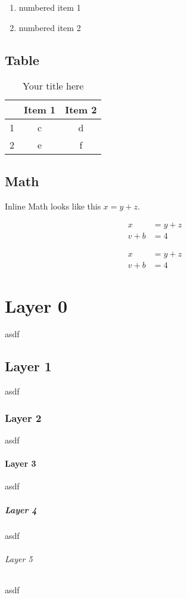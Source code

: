 \begin{enumerate}
	\item numbered item 1
	\item numbered item 2
\end{enumerate}

\section{Table}

\begin{table}[H] %
	\begin{center}
		\begin{tabular}{ccc}
			& Item 1 & Item 2 \\
			\toprule
			1 & c & d \\
			2 & e & f
		\end{tabular}
		\caption{Your title here}
		\label{tab:8bitnumber}
	\end{center}
\end{table}

\section{Math}

Inline Math looks like this $x = y + z$.

\begin{align}
	x &= y + z \\
	v + b &= 4
\end{align}

\begin{align*}
	x &= y + z \\
	v + b &= 4
\end{align*}

\newpage

\chapter{Layer 0}
asdf

\section{Layer 1}
asdf

\subsection{Layer 2}
asdf

\subsubsection{Layer 3}
asdf

\paragraph{Layer 4}
asdf

\subparagraph{Layer 5}
asdf
